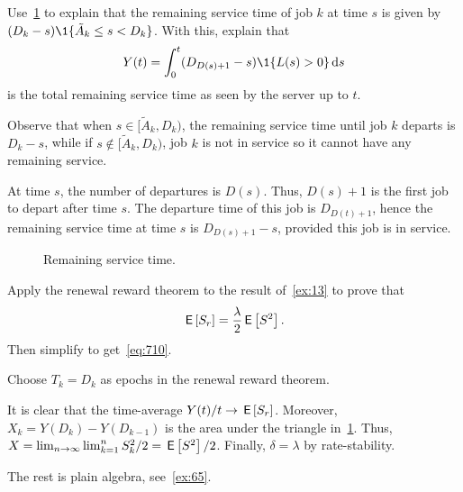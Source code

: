 \begin{exercise}
 Use~\cref{fig:mg1remainingservicetime} to explain that the remaining service time of job $k$ at time $s$ is given by
$(D_k-s)\1{\tilde A_k \leq s < D_k}$.
With this, explain that
 \begin{equation*}
 Y(t) = \int_0^t (D_{D(s)+1}-s)\1{L(s) > 0} \d s
 \end{equation*}
is the total remaining service time as seen by the server up to $t$. 
\begin{solution}
 Observe that when $s\in [\tilde A_k, D_k)$, the remaining service time until job $k$ departs is $D_k-s $, while if $s\not \in [\tilde A_k, D_k)$, job $k$ is not in service so it cannot have any remaining service.

 At time $s$, the number of departures is $D(s)$.
 Thus, $D(s)+1$ is the first job to depart after time $s$.
 The departure time of this job is $D_{D(t)+1}$, hence the remaining service time at time $s$ is $D_{D(s)+1}-s$, provided this job is in service.
\end{solution}
\end{exercise}


\begin{figure}[htb]
 \centering
{}

 \caption{Remaining service time.}
 \label{fig:mg1remainingservicetime}
\end{figure}

\begin{exercise}
Apply the renewal reward theorem to the result of~\cref{ex:13} to prove that 
\begin{equation}\label{eq:34}
\,\mathsf{E}\left[S_r\right] = \frac{\lambda}2 \,\mathsf{E}\left[S^2\right]. 
\end{equation}
Then simplify to get~\cref{eq:710}. 
\begin{hint}
 Choose $T_k=D_k$ as epochs in the renewal reward theorem.
\end{hint}
\begin{solution}
 It is clear that the time-average $Y(t)/t \to \,\mathsf{E}\left[S_r\right]$.
 Moreover, $X_k = Y(D_k) - Y(D_{k-1})$ is the area under the triangle in~\cref{fig:mg1remainingservicetime}.
 Thus, $X=\lim_{n\to\infty} \lim_{k=1}^n S_k^2/ 2 = \,\mathsf{E}\left[S^2\right]/2$.
 Finally, $\delta = \lambda$ by rate-stability.

 The rest is plain algebra, see~\cref{ex:65}.
\end{solution}
\end{exercise}


